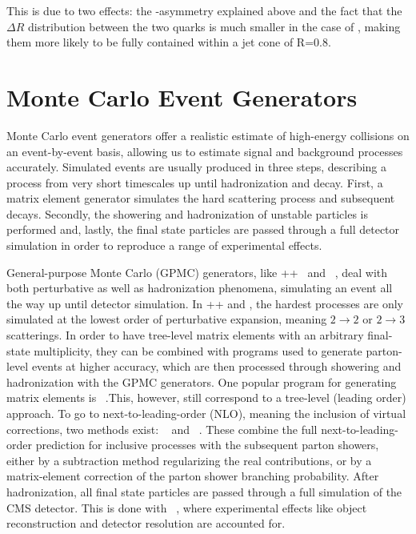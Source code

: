  This is due to two effects: the \PT-asymmetry explained above and the fact that the $\Delta R$ distribution between the two quarks is much smaller in the case of \PWL, making them more likely to be fully contained within a jet cone of R=0.8.

\newpage
\section{Monte Carlo Event Generators}

Monte Carlo event generators offer a realistic estimate of high-energy collisions on an event-by-event basis, allowing us to estimate signal and background processes accurately. Simulated events are usually produced in three steps, describing a process from very short timescales up until hadronization and decay. First, a matrix element generator simulates the hard scattering process and subsequent decays. Secondly, the showering and hadronization of unstable particles is performed and, lastly, the final state particles are passed through a full detector simulation in order to reproduce a range of experimental effects.\par

General-purpose Monte Carlo (GPMC) generators, like \HERWIG++~\cite{Bahr:2008pv} and ~\cite{Sjostrand:2014zea}, deal with both perturbative as well as hadronization phenomena, simulating an event all the way up until detector simulation. In \HERWIG++ and , the hardest processes are only simulated at the lowest order of perturbative expansion, meaning $2 \rightarrow 2$ or $2 \rightarrow 3$ scatterings. In order to have  tree-level matrix elements with an arbitrary final-state multiplicity, they can be combined with programs used to generate parton-level events at higher accuracy, which are then processed through showering and hadronization with the GPMC generators. One popular program for generating matrix elements is \MADGRAPH~\cite{Aad2015}.This, however, still correspond to a tree-level (leading order) approach. To go to next-to-leading-order (NLO), meaning the inclusion of virtual corrections, two methods exist: \MCATNLO~\cite{Frixione:2002ik,Frixione:2003ei} and \POWHEG~\cite{Frixione:2007vw}. These combine the full next-to-leading-order prediction for inclusive processes with the subsequent parton showers, either by a subtraction method regularizing the real contributions, or by a matrix-element correction of the parton shower branching probability. After hadronization, all final state particles are passed through a full simulation of the CMS detector. This is done with \GEANTfour~\cite{AGOSTINELLI2003250}, where experimental effects like object reconstruction and detector resolution are accounted for.\par

